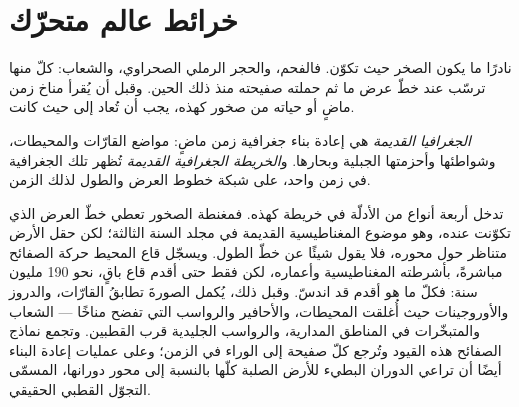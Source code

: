 \section{خرائط عالم متحرّك}\label{sec:b2:phanerozoic-earth:maps}

نادرًا ما يكون الصخر حيث تكوّن. فالفحم، والحجر الرملي الصحراوي، والشعاب: كلّ منها ترسّب عند
خطّ عرض ما ثم حملته صفيحته منذ ذلك الحين. وقبل أن يُقرأ مناخ زمن ماضٍ أو حياته
من صخور كهذه، يجب أن تُعاد إلى حيث كانت.

\begin{definition}\label{def:b2:phanerozoic-earth:palaeogeography}
\emph{الجغرافيا القديمة} هي إعادة بناء جغرافية زمن
ماضٍ: مواضع القارّات والمحيطات، وشواطئها وأحزمتها الجبلية
وبحارها. و\emph{الخريطة الجغرافية القديمة} تُظهر تلك الجغرافية في زمن
واحد، على شبكة خطوط العرض والطول لذلك الزمن.
\end{definition}

تدخل أربعة أنواع من الأدلّة في خريطة كهذه. فمغنطة الصخور تعطي خطّ العرض الذي
تكوّنت عنده، وهو موضوع المغناطيسية القديمة في مجلد السنة الثالثة؛ لكن حقل الأرض
متناظر حول محوره، فلا يقول شيئًا عن خطّ الطول. ويسجّل قاع المحيط حركة
الصفائح مباشرةً، بأشرطته المغناطيسية وأعماره، لكن فقط حتى أقدم قاع
باقٍ، نحو 190 مليون سنة: فكلّ ما هو أقدم قد اندسّ. وقبل ذلك،
يُكمل الصورةَ تطابقُ القارّات، والدروز والأوروجينات حيث أُغلقت المحيطات، والأحافير
والرواسب التي تفضح مناخًا --- الشعاب والمتبخّرات في المناطق المدارية، والرواسب الجليدية قرب
القطبين. وتجمع نماذج الصفائح هذه القيود وتُرجع كلّ صفيحة إلى الوراء في
الزمن؛ وعلى عمليات إعادة البناء أيضًا أن تراعي الدوران البطيء للأرض الصلبة كلّها بالنسبة
إلى محور دورانها، المسمّى التجوّل القطبي الحقيقي.

